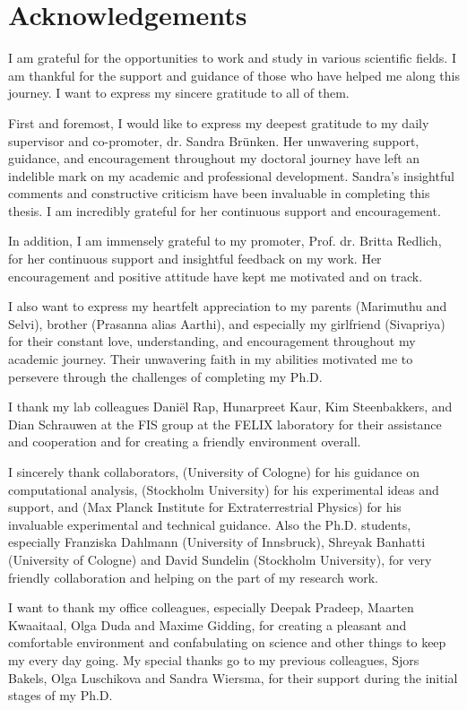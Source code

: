 \chapter{Acknowledgements}
\label{acknowledgements}

I am grateful for the opportunities to work and study in various scientific fields. I am thankful for the support and guidance of those who have helped me along this journey. I want to express my sincere gratitude to all of them.

First and foremost, I would like to express my deepest gratitude to my daily supervisor and co-promoter, dr. Sandra Br\"{u}nken. Her unwavering support, guidance, and encouragement throughout my doctoral journey have left an indelible mark on my academic and professional development. 
Sandra's insightful comments and constructive criticism have been invaluable in completing this thesis. I am incredibly grateful for her continuous support and encouragement.

In addition, I am immensely grateful to my promoter, Prof. dr. Britta Redlich, for her continuous support and insightful feedback on my work. Her encouragement and positive attitude have kept me motivated and on track.

I also want to express my heartfelt appreciation to my parents (Marimuthu and Selvi), brother (Prasanna alias Aarthi), and especially my girlfriend (Sivapriya) for their constant love, understanding, and encouragement throughout my academic journey. Their unwavering faith in my abilities motivated me to persevere through the challenges of completing my Ph.D.

I thank my lab colleagues Dani\"{e}l Rap, Hunarpreet Kaur, Kim Steenbakkers, and Dian Schrauwen at the FIS group at the FELIX laboratory for their assistance and cooperation and for creating a friendly environment overall.

I sincerely thank collaborators,  (University of Cologne) for his guidance on computational analysis,  (Stockholm University) for his experimental ideas and support, and  (Max Planck Institute for Extraterrestrial Physics) for his invaluable experimental and technical guidance.  Also the Ph.D. students, especially Franziska Dahlmann (University of Innsbruck), Shreyak Banhatti (University of Cologne) and David Sundelin (Stockholm University), for very friendly collaboration and helping on the part of my research work.

 I want to thank my office colleagues, especially Deepak Pradeep, Maarten Kwaaitaal, Olga Duda and Maxime Gidding, for creating a pleasant and comfortable environment and confabulating on science and other things to keep my every day going. My special thanks go to my previous colleagues, Sjors Bakels, Olga Luschikova and Sandra Wiersma, for their support during the initial stages of my Ph.D.


